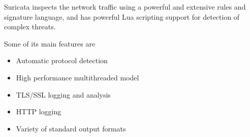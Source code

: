 \documentclass[main.tex]{subfiles}
\begin{document}
Suricata inspects the network traffic using a powerful and extensive rules and
signature language, and has powerful Lua scripting support for detection of
complex threats.

Some of its main features are

\begin{itemize}
  \item Automatic protocol detection
  \item High performance multithreaded model
  \item TLS/SSL logging and analysis
  \item HTTP logging
  \item Variety of standard output formats
\end{itemize}
\end{document}
